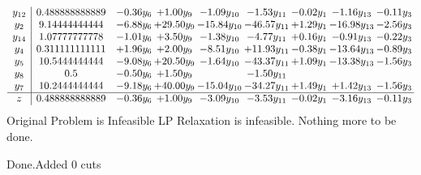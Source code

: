 \documentclass[8pt]{article}
\begin{document}
\[\begin{array}{c| c c@{\hskip 2pt} c@{\hskip 2pt} c@{\hskip 2pt} c@{\hskip 2pt} c@{\hskip 2pt} c@{\hskip 2pt} c@{\hskip 2pt} }
 y_{12}   &  0.488888888889 & -0.36 y_{6} & +  1.00 y_{9} & -1.09 y_{10} & -1.53 y_{11} & -0.02 y_{1} & -1.16 y_{13} & -0.11 y_{3}\\
 y_{2}   &  9.14444444444 & -6.88 y_{6} & + 29.50 y_{9} & -15.84 y_{10} & -46.57 y_{11} & +  1.29 y_{1} & -16.98 y_{13} & -2.56 y_{3}\\
 y_{14}   &  1.07777777778 & -1.01 y_{6} & +  3.50 y_{9} & -1.38 y_{10} & -4.77 y_{11} & +  0.16 y_{1} & -0.91 y_{13} & -0.22 y_{3}\\
 y_{4}   &  0.311111111111 & +  1.96 y_{6} & +  2.00 y_{9} & -8.51 y_{10} & + 11.93 y_{11} & -0.38 y_{1} & -13.64 y_{13} & -0.89 y_{3}\\
 y_{5}   &  10.5444444444 & -9.08 y_{6} & + 20.50 y_{9} & -1.64 y_{10} & -43.37 y_{11} & +  1.09 y_{1} & -13.38 y_{13} & -1.56 y_{3}\\
 y_{8}   &  0.5 & -0.50 y_{6} & +  1.50 y_{9} &   & -1.50 y_{11} &    &    &   \\
 y_{7}   &  10.2444444444 & -9.18 y_{6} & + 40.00 y_{9} & -15.04 y_{10} & -34.27 y_{11} & +  1.49 y_{1} & +  1.42 y_{13} & -1.56 y_{3}\\
\hline
z    &  0.488888888889 & -0.36 y_{6} & +  1.00 y_{9} & -3.09 y_{10} & -3.53 y_{11} & -0.02 y_{1} & -3.16 y_{13} & -0.11 y_{3}\\
\end{array}\]
Original Problem is Infeasible
 LP Relaxation is infeasible. Nothing more to be done. 

Done.Added 0 cuts 
\end{document}
